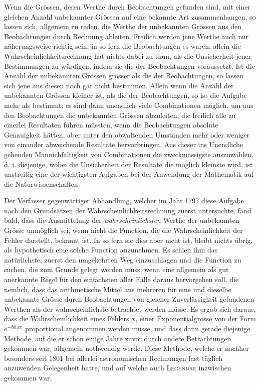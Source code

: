Wenn die Grössen, deren Werthe durch Beobachtungen gefunden sind, mit einer gleichen Anzahl unbekannter Grössen auf eine bekannte Art zusammenhangen, so lassen sich, allgemein zu reden, die Werthe der unbekannten Grössen
aus den Beobachtungen durch Rechnung ableiten. Freilich werden jene Werthe auch nur näherungsweise richtig sein, in so fern die Beobachtungen es waren: allein die Wahrscheinlichkeitsrechnung hat nichts dabei zu thun, als die Unsicherheit jener Bestimmungen zu würdigen, indem sie die der Beobachtungen voraussetzt. Ist die Anzahl der unbekannten Grössen grösser als die der Beobachtungen, so lassen sich jene aus diesen noch gar nicht bestimmen. Allein wenn die Anzahl der unbekannten Grössen kleiner ist, als die der Beobachtungen, so ist die Aufgabe mehr als bestimmt: es sind dann unendlich viele Combinationen möglich, um aus den Beobachtungen die unbekannten Grössen abzuleiten, die freilich alle zu einerlei Resultaten führen müssten, wenn die Beobachtungen absolute Genauigkeit hätten, aber unter den obwaltenden Umständen mehr oder weniger von einander abweichende Resultate hervorbringen. Aus dieser ins Unendliche gehenden Mannichfaltigkeit von Combinationen die zweckmässigste auszuwählen, d. i. diejenige, wobei die Unsicherheit der Resultate die möglich kleinste wird, ist unstreitig eine der wichtigsten Aufgaben bei der Anwendung der Mathematik auf die Naturwissenschaften.

Der Verfasser gegenwärtiger Abhandlung, welcher im Jahr 1797 diese Aufgabe nach den Grundsätzen der Wahrscheinlichkeitsrechnung zuerst untersuchte, fand bald, dass die Ausmittelung der \textit{wahrscheinlichsten} Werthe der unbekannten Grösse unmöglich sei, wenn nicht die Function, die die Wahrscheinlichkeit der Fehler darstellt, bekannt ist. In so fern sie dies aber nicht ist, bleibt nichts übrig, als hypothetisch eine solche Function anzunehmen. Es schien ihm das natürlichste, zuerst den umgekehrten Weg einzuschlagen und die Function zu suchen, die zum Grunde gelegt werden muss, wenn eine allgemein als gut anerkannte Regel für den einfachsten aller Fälle daraus hervorgehen soll, die nemlich, dass das arithmetische Mittel aus mehreren für eine und dieselbe unbekannte Grösse durch Beobachtungen von gleicher Zuverlässigkeit gefundenen Werthen als der wahrscheinlichste betrachtet werden müsse. Es ergab sich daraus, dass die Wahrscheinlichkeit eines Fehlers \(x\), einer Exponentialgrösse von der Form \(e^{-hhxx}\) proportional angenommen werden müsse, und dass dann gerade diejenige Methode, auf die er schon einige Jahre zuvor durch andere Betrachtungen gekommen war, allgemein nothwendig werde. Diese Methode, welche er nachher besonders seit 1801 bei allerlei astronomischen Rechnungen fast täglich anzuwenden Gelegenheit hatte, und auf welche auch \textsc{Legendre} inzwischen gekommen war,
